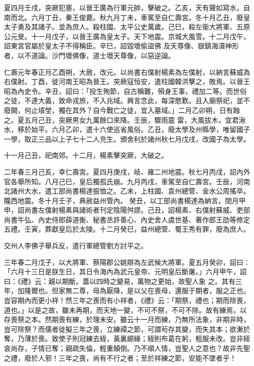 \begin{pinyinscope}
 夏四月壬戌，突厥犯塞，以晉王廣為行軍元帥，擊破之。乙亥，天有聲如寫水，自南而北。六月丁丑，秦王俊薨。秋九月丁未，車駕至自仁壽宮。冬十月乙丑，廢皇太子勇及其諸子。並為庶人。殺柱國、太平公史萬歲。己巳，殺左衛大將軍、五原公元旻。十一月戊子，以晉王廣為皇太子。天下地震。京城大風雪。十二月戊午，詔東宮官屬於皇太子不得稱臣。辛巳，詔毀壞偷盜佛
 及天尊像、嶽鎮海瀆神形者，以不道論。沙門壞佛像，道士壞天尊像，以惡逆論。



 仁壽元年春正月乙酉朔，大赦，改元。以尚書右僕射楊素為左僕射，以納言蘇威為右僕射。丁酉，徙河南王昭為晉王。突厥寇恒安，遣柱國韓洪擊之，敗焉。以晉王昭為內史令。辛丑，詔曰：「投生殉節，自古稱難，殞身王事，禮加二等。而世俗之徒，不達大義，致命戎旅，不入兆域。興言念此，每深愍歎。且入廟祭祀，並不廢闕，何止墳塋，獨在其外？自今戰亡之徒，宜入墓域。」二月乙卯朔，日有蝕之。夏五月己丑，突厥男女九萬餘口來降。壬辰，驟雨震
 雷，大風拔木，宜君湫水，移於始平。六月乙卯，遣十六使巡省風俗。乙丑，廢太學及州縣學，唯留國子一學，取正三品以上子七十二人充生。頒舍利於諸州秋七月戊戌，改國子為太學。



 十一月己丑，祀南郊。十二月，楊素擊突厥，大破之。



 二年春三月己亥，幸仁壽宮。夏四月庚戌，岐、雍二州地震。秋七月丙戌，詔內外官各舉所知。八月己巳，皇后獨孤氏崩。九月丙戌，車駕至自仁壽宮。壬辰，河南北諸州大水，遣工部尚書楊達振恤之。乙未，上柱國、袁州總管、金水公周搖卒。隴西地震。冬十月壬子，典赦益州管內。
 癸丑，以工部尚書楊達為納言。閏月甲申，詔尚書左僕射楊素與諸術者刊定陰陽舛謬。己丑，詔楊素、右僕射蘇威、吏部尚書牛弘、內史侍郎薛道衡、秘書丞許善心、內史舍人虞世基、著作郎王劭等修定五禮。壬寅，葬獻皇后於太陵。十二月癸巳，益州總管、蜀王秀有罪，廢為庶人。



 交州人李佛子舉兵反，遣行軍總管劉方討平之。



 三年春二月戊子，以大將軍、蔡陽郡公姚辯為左武候大將軍。夏五月癸卯，詔曰：「六月十三日是朕生日，其日令海內為武元皇帝、元明皇后斷屠。」六月甲午，詔曰：《禮》云：親以期斷。蓋以四時之變易，萬物之更始，故聖人象
 之。其有三年，加隆爾也。但家無二尊，母為厭降，是以父在喪母，還服于期者，服之正也。豈容期內而更小祥！然三年之喪而有小祥者，《禮》云：「期祭，禮也；期而除喪，道也。」以是之故，雖未再期，而天地一變，不可不祭，不可不除。故有練焉，以存喪祭之本。然期喪有練，於理未安。雖云十一月而練，乃無所法象，非期非時，豈可除祭？而儒者徒擬三年之喪，立練禫之節，可謂茍存其變，而失其本；欲漸於奪，乃薄於喪。致使子則冠練去絰，黃裏縓緣；絰則布葛在躬，粗服未改。豈非絰哀尚存，子情已奪；親疏失倫，輕重顛倒。乃不順人情，豈聖人之意也？故非先聖
 之禮，廢於人邪！三年之喪，尚有不行之者；至於祥練之節，安能不墜者乎！




\end{pinyinscope}
